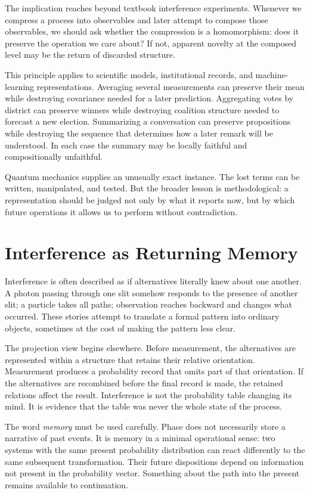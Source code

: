 \documentclass[12pt,openany]{book}
\begin{document}
The implication reaches beyond textbook interference experiments. Whenever we compress a process into observables and later attempt to compose those observables, we should ask whether the compression is a homomorphism: does it preserve the operation we care about? If not, apparent novelty at the composed level may be the return of discarded structure.

This principle applies to scientific models, institutional records, and machine-learning representations. Averaging several measurements can preserve their mean while destroying covariance needed for a later prediction. Aggregating votes by district can preserve winners while destroying coalition structure needed to forecast a new election. Summarizing a conversation can preserve propositions while destroying the sequence that determines how a later remark will be understood. In each case the summary may be locally faithful and compositionally unfaithful.

Quantum mechanics supplies an unusually exact instance. The lost terms can be written, manipulated, and tested. But the broader lesson is methodological: a representation should be judged not only by what it reports now, but by which future operations it allows us to perform without contradiction.

\chapter{Interference as Returning Memory}
Interference is often described as if alternatives literally knew about one another. A photon passing through one slit somehow responds to the presence of another slit; a particle takes all paths; observation reaches backward and changes what occurred. These stories attempt to translate a formal pattern into ordinary objects, sometimes at the cost of making the pattern less clear.

The projection view begins elsewhere. Before measurement, the alternatives are represented within a structure that retains their relative orientation. Measurement produces a probability record that omits part of that orientation. If the alternatives are recombined before the final record is made, the retained relations affect the result. Interference is not the probability table changing its mind. It is evidence that the table was never the whole state of the process.

The word \emph{memory} must be used carefully. Phase does not necessarily store a narrative of past events. It is memory in a minimal operational sense: two systems with the same present probability distribution can react differently to the same subsequent transformation. Their future dispositions depend on information not present in the probability vector. Something about the path into the present remains available to continuation.
\end{document}
